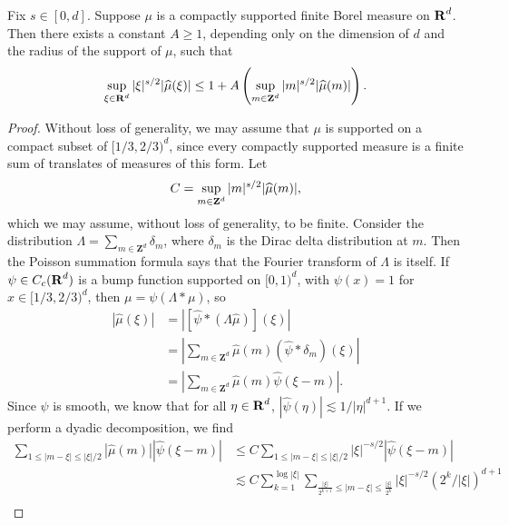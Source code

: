 \begin{lemma} \label{discretefouriermeasures}
    Fix $s \in [0,d]$. Suppose $\mu$ is a compactly supported finite Borel measure on $\operatorname{\mathbf{R}}^d$. Then there exists a constant $A \geq 1$, depending only on the dimension of $d$ and the radius of the support of $\mu$, such that
    \[ \sup_{\xi \in \operatorname{\mathbf{R}}^d} |\xi|^{s/2} |\widehat{\mu}(\xi)| \leq 1 + A \left( \sup_{m \in \operatorname{\mathbf{Z}}^d} |m|^{s/2} |\widehat{\mu}(m)| \right). \]
\end{lemma}
\begin{proof}
    Without loss of generality, we may assume that $\mu$ is supported on a compact subset of $[1/3,2/3)^d$, since every compactly supported measure is a finite sum of translates of measures of this form. Let
    \[ C = \sup_{m \in \operatorname{\mathbf{Z}}^d} |m|^{s/2} |\widehat{\mu}(m)|, \]
    which we may assume, without loss of generality, to be finite. Consider the distribution $\Lambda = \sum_{m \in \mathbf{Z}^d} \delta_m$, where $\delta_m$ is the Dirac delta distribution at $m$. Then the Poisson summation formula says that the Fourier transform of $\Lambda$ is itself. If $\psi \in C_c(\operatorname{\mathbf{R}}^d)$ is a bump function supported on $[0,1)^d$, with $\psi(x) = 1$ for $x \in [1/3,2/3)^d$, then $\mu = \psi (\Lambda * \mu)$, so
    \begin{equation} \label{mubounded}
    \begin{split}
        |\widehat{\mu}(\xi)| &= \left| \left[ \widehat{\psi} * (\Lambda \widehat{\mu}) \right](\xi) \right|\\
        &= \left| \sum_{m \in \mathbf{Z}^d} \widehat{\mu}(m)(\widehat{\psi} * \delta_m)(\xi) \right|\\
        &= \left| \sum_{m \in \mathbf{Z}^d} \widehat{\mu}(m) \widehat{\psi}(\xi - m) \right|.
    \end{split}
    \end{equation}
    Since $\psi$ is smooth, we know that for all $\eta \in \operatorname{\mathbf{R}}^d$, $|\widehat{\psi}(\eta)| \lesssim 1/|\eta|^{d+1}$. If we perform a dyadic decomposition, we find
    \begin{equation}
        \label{calculation1}
    \begin{split}
        \sum_{1 \leq |m - \xi| \leq |\xi|/2} |\widehat{\mu}(m)| |\widehat{\psi}(\xi - m)| &\leq C \sum_{1 \leq |m - \xi| \leq |\xi|/2} |\xi|^{-s/2} |\widehat{\psi}(\xi - m)|\\
        &\lesssim C \sum_{k = 1}^{\log |\xi|} \sum_{\frac{|\xi|}{2^{k+1}} \leq |m - \xi| \leq \frac{|\xi|}{2^{k}}} |\xi|^{-s/2} \left( 2^k/|\xi| \right)^{d+1}\\

\end{split}
\end{equation}
\end{proof}
